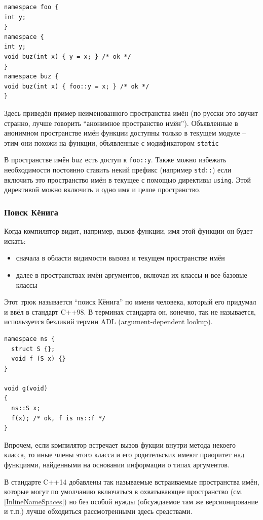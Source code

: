 \documentclass[a4paper,12pt,oneside]{article}
\begin{document}
\begin{lstlisting}
namespace foo {
int y;
}
namespace {
int y;
void buz(int x) { y = x; } /* ok */
}
namespace buz {
void buz(int x) { foo::y = x; } /* ok */
}
\end{lstlisting}

Здесь приведён пример неименованного пространства имён (по русски это звучит странно, лучше говорить ``анонимное пространство имён''). Объявленные в анонимном пространстве имён функции доступны только в текущем модуле -- этим они похожи на функции, объявленные с модификатором \lstinline!static!

В пространстве имён \lstinline!buz! есть доступ к \lstinline!foo::y!. Также можно избежать необходимости постоянно ставить некий префикс (например \lstinline!std::!) если включить это пространство имён в текущее с помощью директивы \lstinline!using!. Этой директивой можно включить и одно имя и целое пространство.

\subsubsection{Поиск Кёнига}\label{subsub:ADL}

Когда компилятор видит, например, вызов функции, имя этой функции он будет искать:
\begin{itemize}
\item
сначала в области видимости вызова и текущем пространстве имён
\item
далее в пространствах имён аргументов, включая их классы и все базовые классы
\end{itemize}

Этот трюк называется ``поиск Кёнига'' по имени человека, который его придумал и ввёл в стандарт C++98. В терминах стандарта он, конечно, так не называется, используется безликий термин ADL (argument-dependent lookup).

\begin{lstlisting}
namespace ns {
  struct S {};
  void f (S x) {}
}

void g(void)
{
  ns::S x;
  f(x); /* ok, f is ns::f */
}
\end{lstlisting}

Впрочем, если компилятор встречает вызов фукции внутри метода некоего класса, то иные члены этого класса и его родительских имеют приоритет над функциями, найденными на основании информации о типах аргументов.

В стандарте C++14 добавлены так называемые встраиваемые пространства имён, которые могут по умолчанию включаться в охватывающее пространство (см. \ref{InlineNameSpaces}) но без особой нужды (обсуждаемое там же версионирование и т.п.) лучше обходиться рассмотренными здесь средствами.
\end{document}
